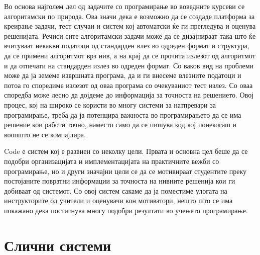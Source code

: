 \documentclass[a4paper,twocolumn]{article}
\begin{document}
Во основа најголем дел од задачите со програмирање во воведните курсеви се
алгоритамски по природа. Ова значи дека е возможно да се создаде платформа за
креирање задачи, тест случаи и систем кој автоматски ќе ги прегледува и оценува
решенијата. Речиси сите алгоритамски задачи може да се дизајнираат така што ќе
вчитуваат некакви податоци од стандарден влез во одреден формат и структура, да
се примени алгоритмот врз нив, а на крај да се прочита излезот од алгоритмот и
да отпечати на стандарден излез во одреден формат. Со ваков вид на проблеми може
да ја земеме извршната програма, да и ги внесеме влезните податоци и потоа го
споредиме излезот од оваа програма со очекуваниот тест излез. Со оваа споредба
може лесно да дојдеме до информација за точноста на решението. Овој процес, кој
на широко се користи во многу системи за натпревари за програмирање, треба да ја
потенцира важноста во програмирањето да се има решение кои работи точно, наместо
само да се пишува код кој понекогаш и воопшто не се компајлира.

Code е систем кој е развиен со неколку цели. Првата и основна цел беше да се
подобри организацијата и имплементацијата на практичните вежби со програмирање,
но и други значајни цели се да се мотивираат студентите преку постојаните
повратни информации за точноста на нивните решенија кои ги добиваат од системот.
Со овој систем сакаме да ја поместиме улогата на инструкторите од учители и
оценувачи кон мотиватори, нешто што се има покажано дека постигнува многу
подобри резултати во учењето програмирање.

\section{Слични системи}
\end{document}
